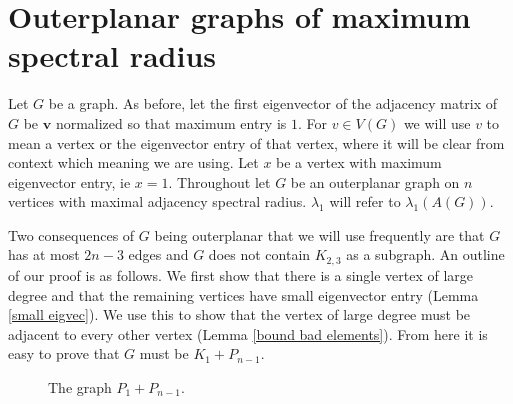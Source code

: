 

\section{Outerplanar graphs of maximum spectral radius}\label{outerplanar}
Let $G$ be a graph. As before, let the first eigenvector of the adjacency matrix of $G$ be $\textbf{v}$ normalized so that maximum entry is $1$. For $v\in V(G)$ we will use $v$ to mean a vertex or the eigenvector entry of that vertex, where it will be clear from context which meaning we are using. Let $x$ be a vertex with maximum eigenvector entry, ie $x=1$.  Throughout let $G$ be an outerplanar graph on $n$ vertices with maximal adjacency spectral radius.  $\lambda_1$ will refer to $\lambda_1(A(G))$. 

Two consequences of $G$ being outerplanar that we will use frequently are that $G$ has at most $2n-3$ edges and $G$ does not contain $K_{2,3}$ as a subgraph. An outline of our proof is as follows. We first show that there is a single vertex of large degree and that the remaining vertices have small eigenvector entry (Lemma \ref{small eigvec}). We use this to show that the vertex of large degree must be adjacent to every other vertex (Lemma \ref{bound bad elements}). From here it is easy to prove that $G$ must be $K_1+P_{n-1}$.

\begin{figure}[]
\begin{center}
\begingroup

\setlength{\unitlength}{.01cm}
{
\setlength{\fboxsep}{10pt}
}
\endgroup
\end{center}
\caption{The graph $P_1 + P_{n-1}$.
   \label{fig:outerplanar}}
\end{figure}

